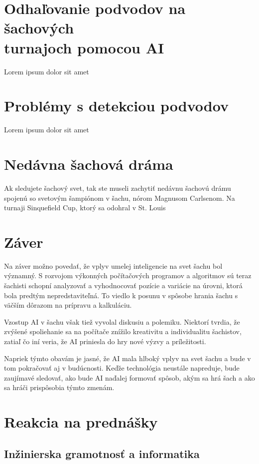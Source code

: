 \documentclass[10pt,oneside,slovak,a4paper]{article}
\begin{document}
\section{Odhaľovanie podvodov na šachových\\
	 turnajoch pomocou AI}

Lorem ipsum dolor sit amet


\section{Problémy s detekciou podvodov}

Lorem ipsum dolor sit amet


\section{Nedávna šachová dráma}

Ak sledujete šachový svet, tak ste museli zachytiť nedávnu šachovú drámu spojenú so svetovým šampiónom v šachu, nórom Magnusom Carlsenom. Na turnaji Sinquefield Cup, ktorý sa odohral v St. Louis


\section{Záver}

Na záver možno povedať, že vplyv umelej inteligencie na svet šachu bol významný. S rozvojom výkonných počítačových programov a algoritmov sú teraz šachisti schopní analyzovať a vyhodnocovať pozície a variácie na úrovni, ktorá bola predtým nepredstaviteľná. To viedlo k posunu v spôsobe hrania šachu s väčším dôrazom na prípravu a kalkuláciu.

Vzostup AI v šachu však tiež vyvolal diskusiu a polemiku. Niektorí tvrdia, že zvýšené spoliehanie sa na počítače znížilo kreativitu a individualitu šachistov, zatiaľ čo iní veria, že AI priniesla do hry nové výzvy a príležitosti.

Napriek týmto obavám je jasné, že AI mala hlboký vplyv na svet šachu a bude v tom pokračovať aj v budúcnosti. Keďže technológia neustále napreduje, bude zaujímavé sledovať, ako bude AI naďalej formovať spôsob, akým sa hrá šach a ako sa hráči prispôsobia týmto zmenám.

\section{Reakcia na prednášky}
\subsection{Inžinierska gramotnosť a informatika}
\end{document}
